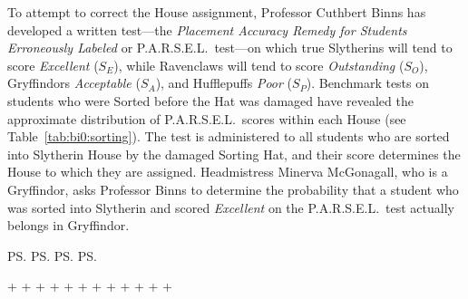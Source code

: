 To attempt to correct the House assignment, Professor Cuthbert Binns has developed a written test---the \emph{Placement Accuracy Remedy for Students Erroneously Labeled} or P.A.R.S.E.L.\ test---on which true Slytherins will tend to score \emph{Excellent} ($S_E$), while Ravenclaws will tend to score \emph{Outstanding} ($S_O$), Gryffindors \emph{Acceptable} ($S_A$), and Hufflepuffs \emph{Poor} ($S_P$). Benchmark tests on students who were Sorted before the Hat was damaged have revealed the approximate distribution of P.A.R.S.E.L.\ scores within each House (see Table~\ref{tab:bi0:sorting}).  The test is administered to all students who are sorted into Slytherin House by the damaged Sorting Hat, and their score determines the House to which they are assigned. Headmistress Minerva McGonagall, who is a Gryffindor, asks Professor Binns to determine the probability that a student who was sorted into Slytherin and scored \emph{Excellent} on the P.A.R.S.E.L.\ test actually belongs in Gryffindor.

     
     
     
     

   
   
   
   

\FPeval{\jsse} {\ps*\pes*\pss}  %
\FPeval{\jgse} {\pg*\peg*\psg}  %
\FPeval{\jrse} {\pr*\per*\psr}  %
\FPeval{\jhse} {\ph*\peh*\psh}  %
\FPeval{\jsso} {\ps*\pos*\pss}  %
\FPeval{\jgso} {\pg*\pog*\psg}  %
\FPeval{\jrso} {\pr*\por*\psr}  %
\FPeval{\jhso} {\ph*\poh*\psh}  %
\FPeval{\jssa} {\ps*\pas*\pss}  %
\FPeval{\jgsa} {\pg*\pag*\psg}  %
\FPeval{\jrsa} {\pr*\parr*\psr} %
\FPeval{\jhsa} {\ph*\pah*\psh}  %
\FPeval{\jssp} {\ps*\pps*\pss}  %
\FPeval{\jgsp} {\pg*\ppg*\psg}  %
\FPeval{\jrsp} {\pr*\ppr*\psr}  %
\FPeval{\jhsp} {\ph*\pph*\psh}  %

\FPeval{\pse} {\jsse + \jgse + \jrse + \jhse}  %
\FPeval{\pso} {\jsso + \jgso + \jrso + \jhso}  %
\FPeval{\psa} {\jssa + \jgsa + \jrsa + \jhsa}  %
\FPeval{\psp} {\jssp + \jgsp + \jrsp + \jhsp}  %

